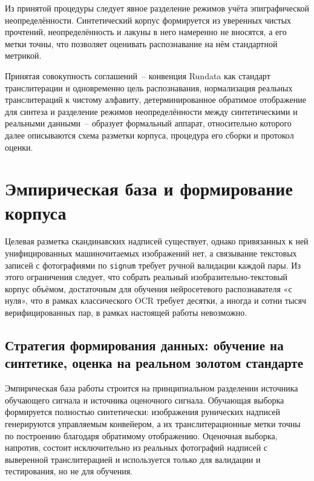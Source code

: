 \documentclass[a4paper,12pt]{extarticle}
\begin{document}
Из принятой процедуры следует явное разделение режимов учёта эпиграфической неопределённости. Синтетический корпус формируется из уверенных чистых прочтений, неопределённость и лакуны в него намеренно не вносятся, а его метки точны, что позволяет оценивать распознавание на нём стандартной метрикой. 

Принятая совокупность соглашений~-- конвенция Rundata как стандарт транслитерации и одновременно цель распознавания, нормализация реальных транслитераций к чистому алфавиту, детерминированное обратимое отображение для синтеза и разделение режимов неопределённости между синтетическими и реальными данными~-- образует формальный аппарат, относительно которого далее описываются схема разметки корпуса, процедура его сборки и протокол оценки.


\section{Эмпирическая база и формирование корпуса}
\label{sec:data}
 
Целевая разметка скандинавских надписей существует, однако привязанных к ней унифицированных машиночитаемых изображений нет, а связывание текстовых записей с фотографиями по \texttt{signum} требует ручной валидации каждой пары. Из этого ограничения следует, что собрать реальный изобразительно-текстовый корпус объёмом, достаточным для обучения нейросетевого распознавателя «с нуля», что в рамках классического OCR требует десятки, а иногда и сотни тысяч верифицированных пар, в рамках настоящей работы невозможно. 
 
\subsection{Стратегия формирования данных: обучение на синтетике, оценка на реальном золотом стандарте}
\label{sec:data-strategy}
 
Эмпирическая база работы строится на принципиальном разделении источника обучающего сигнала и источника оценочного сигнала. Обучающая выборка формируется полностью синтетически: изображения рунических надписей генерируются управляемым конвейером, а их транслитерационные метки точны по построению благодаря обратимому отображению. Оценочная выборка, напротив, состоит исключительно из реальных фотографий надписей с выверенной транслитерацией и используется только для валидации и тестирования, но не для обучения. 
\end{document}
